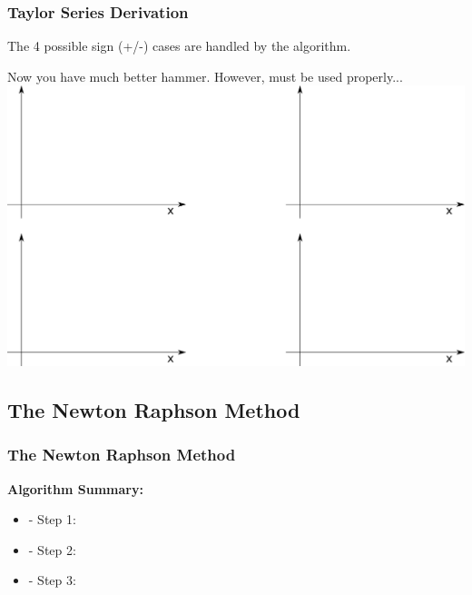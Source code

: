 \documentclass[fleqn]{beamer} %
\newcommand{\sectionIIsubsectionIItitle}{Taylor Series Derivation}
\newcommand{\sectionIIsubsectionIIItitle}{The Newton Raphson Method}
\begin{document}
			\begin{frame}
				\frametitle{\sectionIIsubsectionIItitle} \small
				\bigskip

				The 4 possible sign (+/-) cases are handled by the algorithm. 

				Now you have much better hammer. However, must be used properly... \vspace{3mm}\\
				\includegraphics[scale=.35]{images/topic3_fig2.png}

				\btVFill
			\end{frame}		


		\subsection{\sectionIIsubsectionIIItitle}\label{sectionIIsubsectionIII}

			\begin{frame}
				\frametitle{\sectionIIsubsectionIIItitle}
				\bigskip

				\textbf{Algorithm Summary:} \vspace{3mm}\\
				\begin{itemize}
					\item - Step 1:  \vspace{10mm}\\  
					\item - Step 2:  \vspace{10mm}\\  
					\item - Step 3: 
				\end{itemize}
				\btVFill 
			\end{frame}
\end{document}
